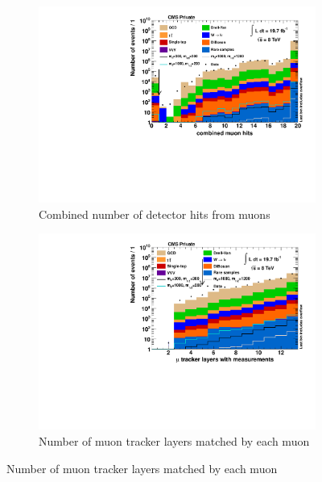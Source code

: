 \begin{figure}[!htbp]
  \ContinuedFloat
  \centering
  \begin{subfigure}[b]{0.495\textwidth}
    \centering
    \includegraphics[width=\textwidth]{plots/nMuon_hits.pdf}
    \caption{Combined number of detector hits from muons\label{fig:muo_hits}}
  \end{subfigure}
  \begin{subfigure}[b]{0.495\textwidth}
    \centering
    \includegraphics[width=\textwidth]{plots/nMuon_StationsMatched.pdf}
    \caption{Number of muon tracker layers matched by each muon\label{fig:muo_stationsmatched}}
  \end{subfigure}
\end{figure}

